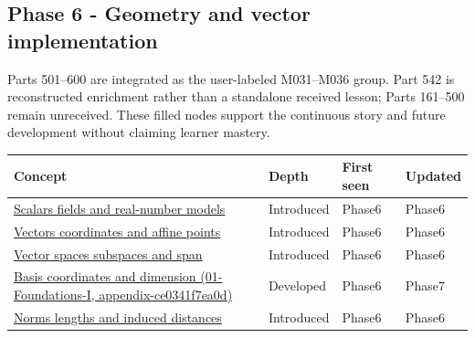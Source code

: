 \subsection{Phase 6 - Geometry and vector implementation}\label{appendix-a6d556a4ef50-phase-6---geometry-and-vector-implementation}

Parts 501--600 are integrated as the user-labeled M031--M036 group. Part 542 is reconstructed enrichment rather than a standalone received lesson; Parts 161--500 remain unreceived. These filled nodes support the continuous story and future development without claiming learner mastery.

{\def\LTcaptype{none} %
\begin{longtable}[]{@{}
  >{\raggedright\arraybackslash}p{}
  >{\raggedright\arraybackslash}p{}
  >{\raggedright\arraybackslash}p{}
  >{\raggedright\arraybackslash}p{}@{}}
\toprule\noalign{}
\begin{minipage}[b]{\linewidth}\raggedright
Concept
\end{minipage} & \begin{minipage}[b]{\linewidth}\raggedright
Depth
\end{minipage} & \begin{minipage}[b]{\linewidth}\raggedright
First seen
\end{minipage} & \begin{minipage}[b]{\linewidth}\raggedright
Updated
\end{minipage} \\
\midrule\noalign{}
\endhead
\bottomrule\noalign{}
\endlastfoot
\hyperref[appendix-52051ad550fe]{Scalars fields and real-number models} & Introduced & Phase6 & Phase6 \\
\hyperref[appendix-0659864c0aa3]{Vectors coordinates and affine points} & Introduced & Phase6 & Phase6 \\
\hyperref[appendix-173b52c063ae]{Vector spaces subspaces and span} & Introduced & Phase6 & Phase6 \\
\href{../01-Foundations-I/main.pdf\#nameddest=appendix-ce0341f7ea0d}{Basis coordinates and dimension (01-Foundations-I, appendix-ce0341f7ea0d)} & Developed & Phase6 & Phase7 \\
\hyperref[appendix-49933872bb51]{Norms lengths and induced distances} & Introduced & Phase6 & Phase6 \\

\end{longtable}}
